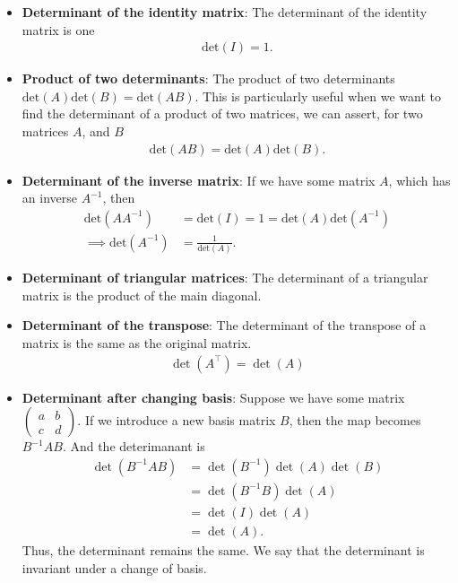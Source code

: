 \documentclass{report}
\begin{document}
    \pagebreak 
    \begin{itemize}
        \item \textbf{Determinant of the identity matrix}: The determinant of the identity matrix is one 
            \begin{align*}
                \text{det}(I) = 1
            .\end{align*}
        \item \textbf{Product of two determinants}: The product of two determinants $\text{det}(A)\text{det}(B) = \text{det}(AB)$. This is particularly useful when we want to find the determinant of a product of two matrices, we can assert, for two matrices $A$, and $B$
            \begin{align*}
                \text{det}(AB) = \text{det}(A)\text{det}(B)        
            .\end{align*}
        \item \textbf{Determinant of the inverse matrix}: If we have some matrix $A$, which has an inverse $A^{-1}$, then
            \begin{align*}
                \text{det}(AA^{-1}) &= \text{det}(I) = 1 = \text{det}(A)\text{det}(A^{-1}) \\
                \implies \text{det}(A^{-1}) &= \frac{1}{\text{det}(A)}
            .\end{align*}
        \item \textbf{Determinant of triangular matrices}: The determinant of a triangular matrix is the product of the main diagonal.
        \item \textbf{Determinant of the transpose}: The determinant of the transpose of a matrix is the same as the original matrix.
            \begin{align*}
                \det(A^{\top})  = \det(A)
            \end{align*}
        \item \textbf{Determinant after changing basis}: Suppose we have some matrix $\begin{pmatrix} a & b \\ c & d\end{pmatrix} $. If we introduce a new basis matrix $B$, then the map becomes $B^{-1}AB$. And the deterimanant is
            \begin{align*}
                \det(B^{-1}AB) &= \det(B^{-1})\det(A)\det(B) \\
                               &= \det(B^{-1}B)\det(A) \\
                               &= \det(I)\det(A) \\
                               &= \det(A)
            .\end{align*}
            Thus, the determinant remains the same. We say that the determinant is invariant under a change of basis.


    \end{itemize}
\end{document}
